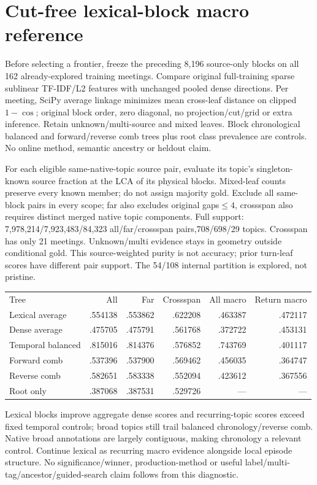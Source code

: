 \documentclass[11pt]{article}
\begin{document}
\section{Cut-free lexical-block macro reference}
Before selecting a frontier, freeze the preceding 8,196 source-only blocks on all
162 already-explored training meetings. Compare original full-training sparse
sublinear TF-IDF/L2 features with unchanged pooled dense directions. Per meeting,
SciPy average linkage minimizes mean cross-leaf distance on clipped
$1-\cos$; original block order, zero diagonal, no projection/cut/grid or extra
inference\cite{averagelinkage}. Retain unknown/multi-source and mixed leaves.
Block chronological balanced and forward/reverse comb trees plus root class
prevalence are controls. No online method, semantic ancestry or heldout claim.

For each eligible same-native-topic source pair, evaluate its topic's
singleton-known source fraction at the LCA of its physical blocks. Mixed-leaf
counts preserve every known member; do not assign majority gold. Exclude all
same-block pairs in every scope; far also excludes original gaps$\le4$, crossspan
also requires distinct merged native topic components. Full support:
7,978,214/7,923,483/84,323 all/far/crossspan pairs,708/698/29 topics. Crossspan
has only 21 meetings. Unknown/multi evidence stays in geometry outside conditional
gold. This source-weighted purity is not accuracy; prior turn-leaf scores have
different pair support. The 54/108 internal partition is explored, not pristine.

\begin{center}\begin{tabular}{lrrrrr}
Tree & All & Far & Crossspan & All macro & Return macro \\
Lexical average & .554138 & .553862 & .622208 & .463387 & .472117 \\
Dense average & .475705 & .475791 & .561768 & .372722 & .453131 \\
Temporal balanced & .815016 & .814376 & .576852 & .743769 & .401117 \\
Forward comb & .537396 & .537900 & .569462 & .456035 & .364747 \\
Reverse comb & .582651 & .583338 & .552094 & .423612 & .367556 \\
Root only & .387068 & .387531 & .529726 & --- & ---
\end{tabular}\end{center}

Lexical blocks improve aggregate dense scores and recurring-topic scores exceed
fixed temporal controls; broad topics still trail balanced chronology/reverse
comb. Native broad annotations are largely contiguous, making chronology a
relevant control. Continue lexical as recurring macro evidence alongside local
episode structure. No significance/winner, production-method or useful
label/multi-tag/ancestor/guided-search claim follows from this diagnostic.
\end{document}
